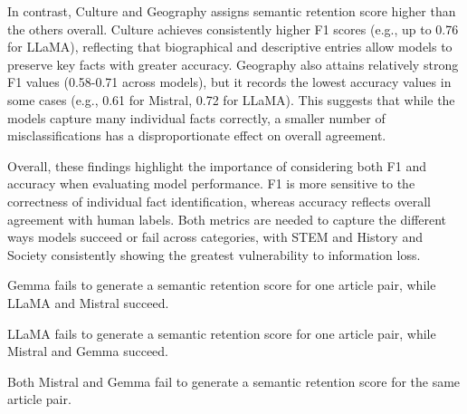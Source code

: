 \documentclass{DESSThesis}
\begin{document}
In contrast, Culture and Geography assigns semantic retention score higher than the others overall. Culture achieves consistently higher F1 scores (e.g., up to 0.76 for LLaMA), reflecting that biographical and descriptive entries allow models to preserve key facts with greater accuracy. Geography also attains relatively strong F1 values (0.58-0.71 across models), but it records the lowest accuracy values in some cases (e.g., 0.61 for Mistral, 0.72 for LLaMA). This suggests that while the models capture many individual facts correctly, a smaller number of misclassifications has a disproportionate effect on overall agreement.

Overall, these findings highlight the importance of considering both F1 and accuracy when evaluating model performance. F1 is more sensitive to the correctness of individual fact identification, whereas accuracy reflects overall agreement with human labels. Both metrics are needed to capture the different ways models succeed or fail across categories, with STEM and History and Society consistently showing the greatest vulnerability to information loss.

\begin{table}[H]
\centering
\caption{Per Category and Per Model - Semantic Retention Scores (10k) and Human Validation Accuracy/F1 (50 samples)}
\label{tab:CategoryModelValidation} 
\begin{threeparttable}
\begin{tablenotes}\footnotesize
\item[*]   Gemma fails to generate a semantic retention score for one article pair, while LLaMA and Mistral succeed.
\item[**]  LLaMA fails to generate a semantic retention score for one article pair, while Mistral and Gemma succeed.
\item[***] Both Mistral and Gemma fail to generate a semantic retention score for the same article pair.
\end{tablenotes}
\end{threeparttable}
\end{table}
\end{document}
